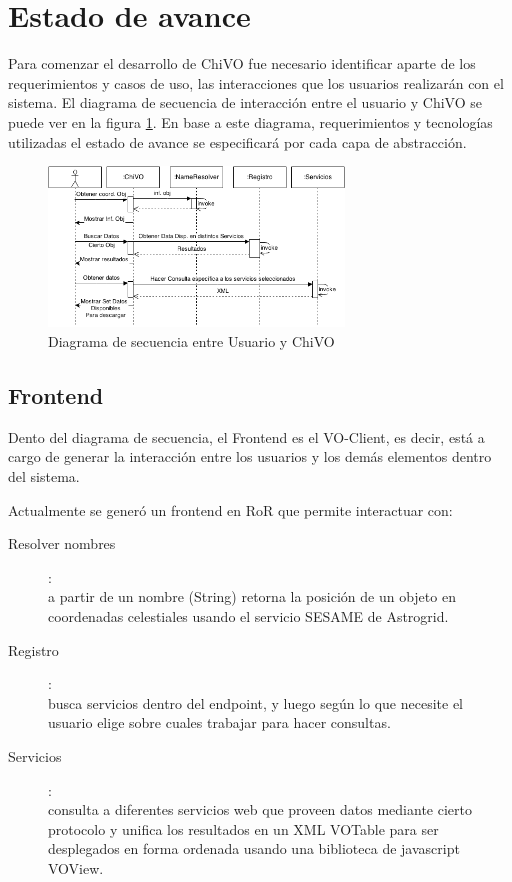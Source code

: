 \section{Estado de avance}

Para comenzar el desarrollo de ChiVO fue necesario identificar aparte de los
requerimientos y casos de uso, las interacciones que los usuarios realizarán
con el sistema. El diagrama de secuencia de interacción entre el usuario y
ChiVO se puede ver en la figura \ref{fig:secuencia}.
En base a este diagrama, requerimientos y tecnologías utilizadas el estado de
avance se especificará por cada capa de abstracción.

\begin{figure}[h!t]
    \centering
    \includegraphics[width=0.7\textwidth]{images/secuencia.png}
    \caption{Diagrama de secuencia entre Usuario y ChiVO}
    \label{fig:secuencia}
\end{figure}

\subsection{Frontend}

Dento del diagrama de secuencia, el Frontend es el VO-Client, es decir, está a cargo
de generar la interacción entre los usuarios y los demás elementos dentro del
sistema.

Actualmente se generó un frontend en RoR que permite interactuar con:

\begin{description}
    \item[Resolver nombres]:\hfill \\
        a partir de un nombre (String) retorna la posición de un objeto en
        coordenadas celestiales usando el servicio SESAME de Astrogrid.
    \item[Registro]: \hfill \\
        busca servicios dentro del endpoint, y luego según lo que necesite el
        usuario elige sobre cuales trabajar para hacer consultas.
    \item[Servicios]: \hfill \\
        consulta a diferentes servicios web que proveen datos mediante cierto
        protocolo y unifica los resultados en un XML VOTable para ser desplegados
        en forma ordenada usando una biblioteca de javascript VOView.
\end{description}

